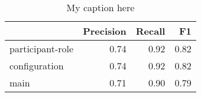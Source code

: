 \begin{table}[!ht]
\centering
\begin{tabular}{lrrr}
\toprule
{} &  Precision &  Recall &   F1 \\
\midrule
participant-role &       0.74 &    0.92 & 0.82 \\
configuration    &       0.74 &    0.92 & 0.82 \\
main             &       0.71 &    0.90 & 0.79 \\
\bottomrule
\end{tabular}
\caption{My caption here}
\label{tab:unit-elements-transitivity-combined-F1}
\end{table}